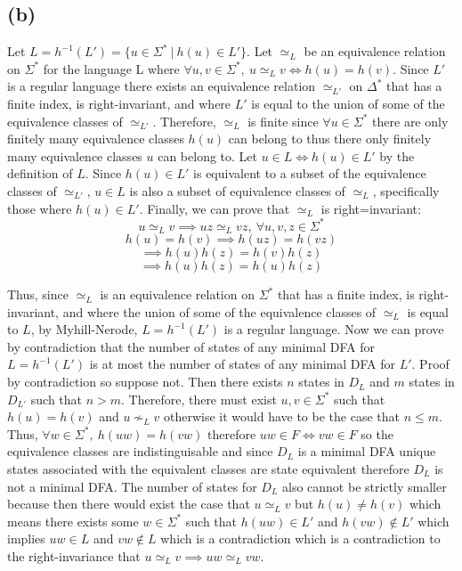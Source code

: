 \documentclass[12pt]{article}
\begin{document}
\subsection*{(b)}
Let $L = h^{-1}(L') = \{u \in \Sigma^*\ |\ h(u) \in L'\}$. Let $\simeq_L$ be an
equivalence relation on $\Sigma^*$ for the language L where
$\forall u,v \in \Sigma^*,\ u \simeq_L v \iff h(u) = h(v)$. Since $L'$ is a
regular language there exists an equivalence relation $\simeq_{L'} $
on $\Delta^*$ that has a finite index, is right-invariant, and where
$L'$ is equal to the union of some of the equivalence classes of $\simeq_{L'}$.
Therefore, $\simeq_L$ is finite since $\forall u \in \Sigma^*$ there are only
finitely many equivalence classes $h(u)$ can belong to thus there only
finitely many equivalence classes $u$ can belong to. Let $u \in L \iff h(u) \in
L'$ by the definition of $L$. Since $h(u) \in L'$ is equivalent to a subset of
the equivalence classes of $\simeq_{L'}$, $u \in L$ is also a subset of
equivalence classes of $\simeq_L$, specifically those where $h(u) \in L'$.
Finally, we can prove that $\simeq_L$ is right=invariant:
$$u \simeq_L v \implies uz \simeq_L vz,\ \forall u,v,z \in \Sigma^*$$
$$h(u) = h(v) \implies h(uz) = h(vz)$$
$$\implies h(u)h(z) = h(v)h(z)$$
$$\implies h(u)h(z) = h(u)h(z)$$

Thus, since $\simeq_L$ is an equivalence relation on $\Sigma^*$ that has a finite
index, is right-invariant, and where the union of some of the equivalence classes
of $\simeq_L$ is equal to $L$, by Myhill-Nerode, $L = h^{-1}(L')$ is a regular
language. Now we can prove by contradiction that the number of states of any
minimal DFA for $L = h^{-1}(L')$ is at most the number of states of any minimal
DFA for $L'$. Proof by contradiction so suppose not. Then there exists
$n$ states in $D_L$ and $m$ states in $D_{L'}$ such that $n > m$. Therefore,
there must exist $u,v \in \Sigma^*$ such that $h(u) = h(v)$ and $u \nsim_L v$
otherwise it would have to be the case that $n \le m$. Thus, $\forall w \in
\Sigma^*,\ h(uw) = h(vw)$ therefore $uw \in F \iff vw \in F$ so the equivalence
classes are indistinguisable and since $D_L$ is a minimal DFA unique states
associated with the equivalent classes are state equivalent therefore $D_L$ is
not a minimal DFA. The number of states for $D_L$ also cannot be strictly
smaller because then there would exist the case that $u \simeq_L v$ but
$h(u) \neq h(v)$ which means there exists some $w \in \Sigma^*$ such that
$h(uw) \in L'$ and $h(vw) \notin L'$ which implies $uw \in L$ and $vw \notin L$
which is a contradiction which is a contradiction to the right-invariance that
$u \simeq_L v \implies uw \simeq_L vw $.
\end{document}
